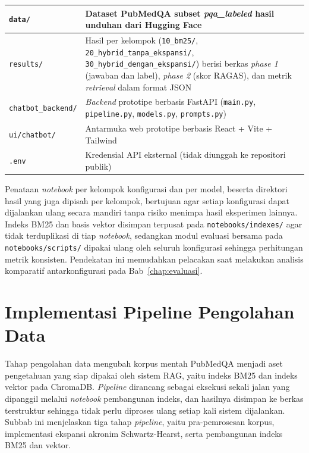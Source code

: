 \begin{table}[H]
\begin{tabular}{|>{\raggedright\arraybackslash}p{4.9cm}|p{8.4cm}|}
\texttt{data/}                                 & Dataset PubMedQA subset \textit{pqa\_labeled} hasil unduhan dari Hugging Face \\ \hline
\texttt{results/}                              & Hasil per kelompok (\texttt{10\_bm25/}, \texttt{20\_hybrid\_\allowbreak tanpa\_ekspansi/}, \texttt{30\_hybrid\_\allowbreak dengan\_ekspansi/}) berisi berkas \textit{phase 1} (jawaban dan label), \textit{phase 2} (skor RAGAS), dan metrik \textit{retrieval} dalam format JSON \\ \hline
\texttt{chatbot\_backend/}                     & \textit{Backend} prototipe berbasis FastAPI (\texttt{main.py}, \texttt{pipeline.py}, \texttt{models.py}, \texttt{prompts.py}) \\ \hline
\texttt{ui/chatbot/}                           & Antarmuka web prototipe berbasis React + Vite + Tailwind \\ \hline
\texttt{.env}                                  & Kredensial API eksternal (tidak diunggah ke repositori publik) \\ \hline
\end{tabular}
\end{table}

Penataan \textit{notebook} per kelompok konfigurasi dan per model, beserta direktori hasil yang juga dipisah per kelompok, bertujuan agar setiap konfigurasi dapat dijalankan ulang secara mandiri tanpa risiko menimpa hasil eksperimen lainnya. Indeks BM25 dan basis vektor disimpan terpusat pada \texttt{notebooks/indexes/} agar tidak terduplikasi di tiap \textit{notebook}, sedangkan modul evaluasi bersama pada \texttt{notebooks/scripts/} dipakai ulang oleh seluruh konfigurasi sehingga perhitungan metrik konsisten. Pendekatan ini memudahkan pelacakan saat melakukan analisis komparatif antarkonfigurasi pada Bab~\ref{chap:evaluasi}.


\section{Implementasi Pipeline Pengolahan Data}
\label{sec:impl-pipeline-data}

Tahap pengolahan data mengubah korpus mentah PubMedQA menjadi aset pengetahuan yang siap dipakai oleh sistem RAG, yaitu indeks BM25 dan indeks vektor pada ChromaDB. \textit{Pipeline} dirancang sebagai eksekusi sekali jalan yang dipanggil melalui \textit{notebook} pembangunan indeks, dan hasilnya disimpan ke berkas terstruktur sehingga tidak perlu diproses ulang setiap kali sistem dijalankan. Subbab ini menjelaskan tiga tahap \textit{pipeline}, yaitu pra-pemrosesan korpus, implementasi ekspansi akronim Schwartz-Hearst, serta pembangunan indeks BM25 dan vektor.

